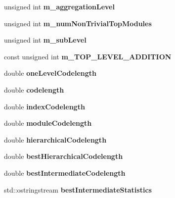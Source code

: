 \begin{DoxyCompactItemize}
unsigned int {\bfseries m\+\_\+aggregation\+Level}
\item 
\mbox{\label{classInfomapBase_a0dd41789ae9237970c18582fc6154830}} 
unsigned int {\bfseries m\+\_\+num\+Non\+Trivial\+Top\+Modules}
\item 
\mbox{\label{classInfomapBase_ad7c51398734e88e0dadc61f881b92599}} 
unsigned int {\bfseries m\+\_\+sub\+Level}
\item 
\mbox{\label{classInfomapBase_a685bea4bbc52e7125950431373c18db7}} 
const unsigned int {\bfseries m\+\_\+\+T\+O\+P\+\_\+\+L\+E\+V\+E\+L\+\_\+\+A\+D\+D\+I\+T\+I\+ON}
\item 
\mbox{\label{classInfomapBase_ad9a7c497570a187787194e341cd8946e}} 
double {\bfseries one\+Level\+Codelength}
\item 
\mbox{\label{classInfomapBase_a74526eeb7ed801c098c49205a95310f0}} 
double {\bfseries codelength}
\item 
\mbox{\label{classInfomapBase_ae1a474d23c1e1d463f88ed04f350d984}} 
double {\bfseries index\+Codelength}
\item 
\mbox{\label{classInfomapBase_a48d4beb1bd668bd4d6bf6b2d903974cb}} 
double {\bfseries module\+Codelength}
\item 
\mbox{\label{classInfomapBase_aa4963cfc549ccddf4d44b45bd0256d76}} 
double {\bfseries hierarchical\+Codelength}
\item 
\mbox{\label{classInfomapBase_a7adef48b01710e6172252878cc73bc92}} 
double {\bfseries best\+Hierarchical\+Codelength}
\item 
\mbox{\label{classInfomapBase_af76299594197c87a986b88bc731520c9}} 
double {\bfseries best\+Intermediate\+Codelength}
\item 
\mbox{\label{classInfomapBase_a5a977d4acbc74556676815a9dc53e024}} 
std\+::ostringstream {\bfseries best\+Intermediate\+Statistics}
\item 

\end{DoxyCompactItemize}

